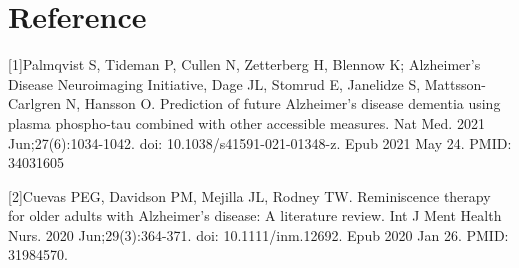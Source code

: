 \chapter{Reference}

  

[1]Palmqvist S, Tideman P, Cullen N, Zetterberg H, Blennow K; Alzheimer’s Disease Neuroimaging Initiative, Dage JL, Stomrud E, Janelidze S, Mattsson-Carlgren N, Hansson O. Prediction of future Alzheimer's disease dementia using plasma phospho-tau combined with other accessible measures. Nat Med. 2021 Jun;27(6):1034-1042. doi: 10.1038/s41591-021-01348-z. Epub 2021 May 24. PMID: 34031605

[2]Cuevas PEG, Davidson PM, Mejilla JL, Rodney TW. Reminiscence therapy for older adults with Alzheimer's disease: A literature review. Int J Ment Health Nurs. 2020 Jun;29(3):364-371. doi: 10.1111/inm.12692. Epub 2020 Jan 26. PMID: 31984570.

